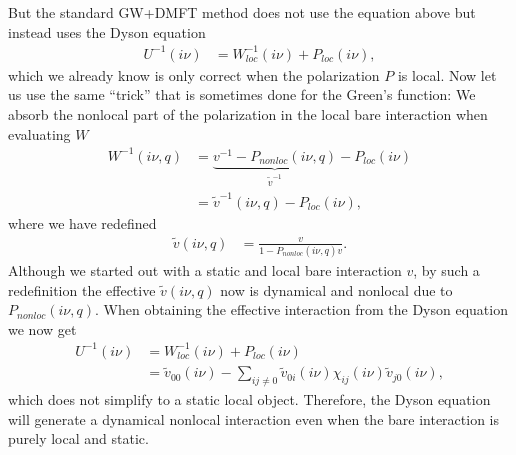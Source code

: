 \documentclass[12pt,a4paper]{scrartcl}
\numberwithin{equation}{section}
\begin{document}
 But the standard GW+DMFT method does not use the equation above but instead uses
 the Dyson equation
 \begin{align}
 U^{-1}(i\nu) 
 &=  W^{-1}_{loc}(i\nu)  + P_{loc}(i\nu) ,
\end{align}
which we already know is only correct when the polarization $P$ is local.
Now let us use the same ``trick'' that is sometimes done for the Green's function:
We absorb the nonlocal part of the polarization in the local bare interaction  when evaluating $W$
\begin{align}
 W^{-1}(i\nu,q) 
 &= \underbrace{ v^{-1} - P_{nonloc}(i\nu,q)}_{\tilde{v}^{-1}} - P_{loc}(i\nu)  \\
 &= \tilde{v}^{-1}(i\nu,q) - P_{loc}(i\nu) ,
\end{align}
where we have redefined
\begin{align}
 \tilde{v}(i\nu,q) &= \frac{v}{1 - P_{nonloc}(i\nu,q)v}.
\end{align}
Although we started out with a static and local bare interaction $v$, by such a redefinition
the effective $\tilde{v}(i\nu,q)$ now is dynamical and nonlocal due to $P_{nonloc}(i\nu,q)$.
When obtaining the effective interaction from the Dyson equation we now get 
 \begin{align}
 U^{-1}(i\nu) 
 &=  W^{-1}_{loc}(i\nu)  + P_{loc}(i\nu)  \\
 &= \tilde{v}_{00}(i\nu) - \sum_{ij\neq 0} \tilde{v}_{0i}(i\nu)  \chi_{ij}(i\nu) \tilde{v}_{j0}(i\nu),
\end{align}
which does not simplify to a static local object. Therefore, the Dyson equation will generate a dynamical
nonlocal interaction even when the bare interaction is purely local and static.

 
\end{document}
